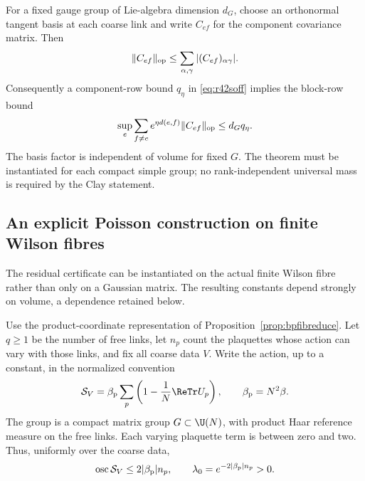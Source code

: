 For a fixed gauge group of Lie-algebra dimension $d_G$, choose an
orthonormal tangent basis at each coarse link and write $C_{ef}$ for
the component covariance matrix. Then
\[
 \|C_{ef}\|_{\rm op}\le\sum_{\alpha,\gamma}
                              |(C_{ef})_{\alpha\gamma}|.
\]
Consequently a component-row bound $q_\eta$ in
\eqref{eq:r42soff} implies the block-row bound
\begin{equation}\label{eq:r42blockrow}
 \sup_e\sum_{f\ne e}e^{\eta d(e,f)}\|C_{ef}\|_{\rm op}
                                      \le d_Gq_\eta.
\end{equation}
The basis factor is independent of volume for fixed $G$. The theorem
must be instantiated for each compact simple group; no rank-independent
universal mass is required by the Clay statement.

\subsection{An explicit Poisson construction on finite Wilson fibres}
\label{ssec:r42wilson}

The residual certificate can be instantiated on the actual finite
Wilson fibre rather than only on a Gaussian matrix. The resulting
constants depend strongly on volume, a dependence retained below.

Use the product-coordinate representation of
Proposition~\ref{prop:bpfibreduce}. Let $q\ge1$ be the number of free
links, let $n_p$ count the plaquettes whose action can vary with those
links, and fix all coarse data $V$. Write the action, up to a constant,
in the normalized convention
\begin{equation}\label{eq:r42wilsonaction}
 \mathcal S_V=\beta_{\rm p}\sum_p
       \left(1-\frac1N\ReTr U_p\right),\qquad
 \beta_{\rm p}=N^2\beta.
\end{equation}
The group is a compact matrix group $G\subset\U(N)$, with product Haar
reference measure on the free links. Each varying plaquette term is
between zero and two. Thus, uniformly over the coarse data,
\begin{equation}\label{eq:r42lambda0}
 \operatorname{osc}\mathcal S_V\le2|\beta_{\rm p}|n_p,
 \qquad \lambda_0=e^{-2|\beta_{\rm p}|n_p}>0.
\end{equation}

